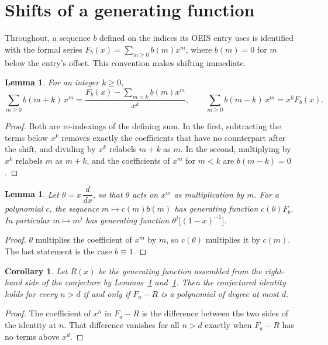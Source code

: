 \documentclass[11pt,a4paper]{article}
\theoremstyle{plain}
\newtheorem{lemma}[theorem]{Lemma}
\newtheorem{corollary}[theorem]{Corollary}
\theoremstyle{definition}
\begin{document}
\section{Shifts of a generating function}

Throughout, a sequence $b$ defined on the indices its OEIS entry uses is identified with
the formal series $F_{b}(x)=\sum_{m\ge0}b(m)x^{m}$, where $b(m)=0$ for $m$ below the
entry's offset. This convention makes shifting immediate.

\begin{lemma}\label{lem:shift}
For an integer $k\ge0$,
\[
\sum_{m\ge0}b(m+k)\,x^{m}=\frac{F_{b}(x)-\sum_{m<k}b(m)x^{m}}{x^{k}},
\qquad
\sum_{m\ge0}b(m-k)\,x^{m}=x^{k}F_{b}(x).
\]
\end{lemma}

\begin{proof}
Both are re-indexings of the defining sum. In the first, subtracting the terms below
$x^{k}$ removes exactly the coefficients that have no counterpart after the shift, and
dividing by $x^{k}$ relabels $m+k$ as $m$. In the second, multiplying by $x^{k}$ relabels
$m$ as $m+k$, and the coefficients of $x^{m}$ for $m<k$ are $b(m-k)=0$.
\end{proof}

\begin{lemma}\label{lem:theta}
Let $\theta=x\,\dfrac{d}{dx}$, so that $\theta$ acts on $x^{m}$ as multiplication by $m$.
For a polynomial $c$, the sequence $m\mapsto c(m)b(m)$ has generating function
$c(\theta)F_{b}$. In particular $m\mapsto m^{j}$ has generating function
$\theta^{j}\bigl[(1-x)^{-1}\bigr]$.
\end{lemma}

\begin{proof}
$\theta$ multiplies the coefficient of $x^{m}$ by $m$, so $c(\theta)$ multiplies it by
$c(m)$. The last statement is the case $b\equiv1$.
\end{proof}

\begin{corollary}\label{cor:criterion}
Let $R(x)$ be the generating function assembled from the right-hand side of the conjecture
by Lemmas~\ref{lem:shift} and~\ref{lem:theta}. Then the conjectured identity holds for
every $n>d$ if and only if $F_{a}-R$ is a polynomial of degree at most $d$.
\end{corollary}

\begin{proof}
The coefficient of $x^{n}$ in $F_{a}-R$ is the difference between the two sides of the
identity at $n$. That difference vanishes for all $n>d$ exactly when $F_{a}-R$ has no
terms above $x^{d}$.
\end{proof}
\end{document}
